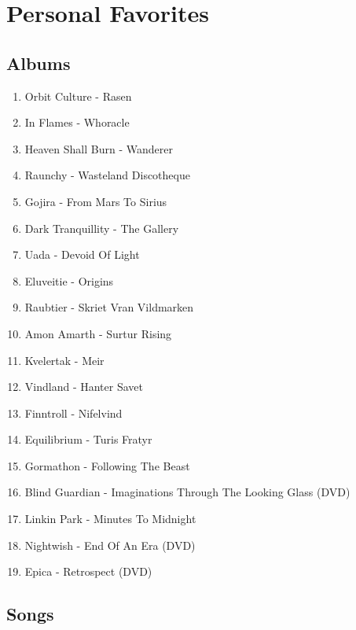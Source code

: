 \chapter{Personal Favorites}\label{fav}

\section{Albums}

\begin{enumerate}
	\item Orbit Culture - Rasen
	\item In Flames - Whoracle
	\item Heaven Shall Burn - Wanderer
	\item Raunchy - Wasteland Discotheque
	\item Gojira - From Mars To Sirius
	\item Dark Tranquillity - The Gallery
	\item Uada - Devoid Of Light
	\item Eluveitie - Origins
	\item Raubtier - Skriet Vran Vildmarken
	\item Amon Amarth - Surtur Rising
	\item Kvelertak - Meir
	\item Vindland - Hanter Savet
	\item Finntroll - Nifelvind
	\item Equilibrium - Turis Fratyr
	\item Gormathon - Following The Beast
	\item Blind Guardian - Imaginations Through The Looking Glass (DVD)
	\item Linkin Park - Minutes To Midnight
	\item Nightwish - End Of An Era (DVD)
	\item Epica - Retrospect (DVD)
\end{enumerate}

\newpage
\section{Songs}

